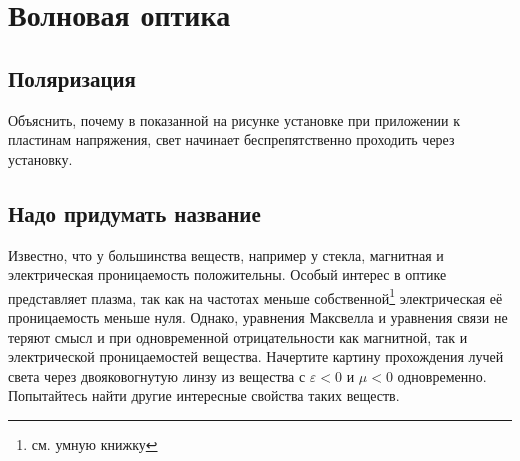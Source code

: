 \thispagestyle{empty}
\chapter{Волновая оптика}
\clearpage
\section{Поляризация}
\begin{problem}
Объяснить, почему в показанной на рисунке установке при приложении к пластинам напряжения, свет начинает беспрепятственно проходить через установку.
\end{problem}
\section{Надо придумать название}
\begin{problem}
Известно, что у большинства веществ, например у стекла, магнитная и электрическая проницаемость положительны. Особый интерес в оптике представляет плазма, так как на частотах меньше собственной\footnote{см. умную книжку} электрическая её проницаемость меньше нуля. Однако, уравнения Максвелла и уравнения связи не теряют смысл и при одновременной отрицательности как магнитной, так и электрической проницаемостей вещества. Начертите картину прохождения лучей света через двояковогнутую линзу из вещества с $\varepsilon<0$ и $\mu<0$ одновременно. Попытайтесь найти другие интересные свойства таких веществ.
\end{problem}